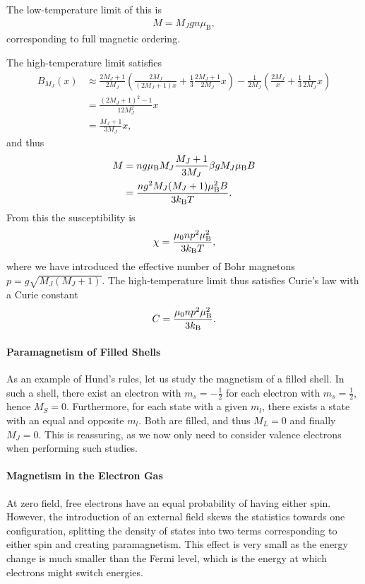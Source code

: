 The low-temperature limit of this is
\begin{align*}
	M = M_{J}gn\mu_{\text{B}},
\end{align*}
corresponding to full magnetic ordering.

The high-temperature limit satisfies
\begin{align*}
	B_{M_{J}}(x) &\approx \frac{2M_{J} + 1}{2M_{J}}\left(\frac{2M_{J}}{(2M_{J} + 1)x} + \frac{1}{3}\frac{2M_{J} + 1}{2M_{J}}x\right) - \frac{1}{2M_{J}}\left(\frac{2M_{J}}{x} + \frac{1}{3}\frac{1}{2M_{J}}x\right) \\
	             &= \frac{(2M_{J} + 1)^{2} - 1}{12M_{J}^{2}}x \\
	             &= \frac{M_{J} + 1}{3M_{J}}x,
\end{align*}
and thus
\begin{align*}
	M &= ng\mu_{\text{B}}M_{J}\frac{M_{J} + 1}{3M_{J}}\beta gM_{J}\mu_{\text{B}}B \\
	  &= \frac{ng^{2}M_{J}(M_{J} + 1)\mu_{\text{B}}^{2}B}{3k_{\text{B}} T}.
\end{align*}
From this the susceptibility is
\begin{align*}
	\chi = \frac{\mu_{0}np^{2}\mu_{\text{B}}^{2}}{3k_{\text{B}} T},
\end{align*}
where we have introduced the effective number of Bohr magnetons $p = g\sqrt{M_{J}(M_{J} + 1)}$. The high-temperature limit thus satisfies Curie's law with a Curie constant
\begin{align*}
	C = \frac{\mu_{0}np^{2}\mu_{\text{B}}^{2}}{3k_{\text{B}}}.
\end{align*}

\paragraph{Paramagnetism of Filled Shells}
As an example of Hund's rules, let us study the magnetism of a filled shell. In such a shell, there exist an electron with $m_{s} = -\frac{1}{2}$ for each electron with $m_{s} = \frac{1}{2}$, hence $M_{S} = 0$. Furthermore, for each state with a given $m_{l}$, there exists a state with an equal and opposite $m_{l}$. Both are filled, and thus $M_{L} = 0$ and finally $M_{J} = 0$. This is reassuring, as we now only need to consider valence electrons when performing such studies.

\paragraph{Magnetism in the Electron Gas}
At zero field, free electrons have an equal probability of having either spin. However, the introduction of an external field skews the statistics towards one configuration, splitting the density of states into two terms corresponding to either spin and creating paramagnetism. This effect is very small as the energy change is much smaller than the Fermi level, which is the energy at which electrons might switch energies.

